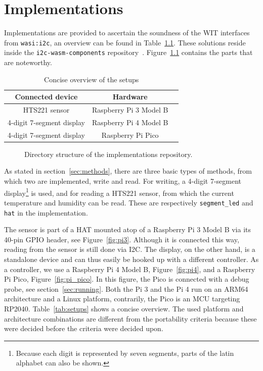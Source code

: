 \chapter{Implementations}
\label{chap:implementation}

Implementations are provided to ascertain the soundness of the \gls{WIT} interfaces from \texttt{wasi:i2c}, an overview can be found in Table~\ref{tab:impls}. These solutions reside inside the \texttt{i2c-wasm-components} repository~\cite{gh:iwc}. Figure~\ref{fig:dirtree} contains the parts that are noteworthy.

\begin{table}[h]
	\centering
	\captionsetup{justification=centering}
	\begin{tabular}{c c l}
		\toprule
		Connected device & Hardware \\ \midrule
        HTS221 sensor & Raspberry Pi 3 Model B \\
        4-digit 7-segment display & Raspberry Pi 4 Model B \\
        4-digit 7-segment display & Raspberry Pi Pico  \\
		\bottomrule
	\end{tabular}
    \caption{Concise overview of the setups}
	\label{tab:impls}
\end{table}

\begin{figure}[h]
\caption{Directory structure of the implementations repository.}
\label{fig:dirtree}
\end{figure}

As stated in section~\ref{sec:methods}, there are three basic types of methods, from which two are implemented, write and read. For writing, a 4-digit 7-segment display\footnote{Because each digit is represented by seven segments, parts of the latin alphabet can also be shown.} is used, and for reading a HTS221 sensor, from which the current temperature and humidity can be read. These are respectively \texttt{segment\_led} and \texttt{hat} in the implementation.

The sensor is part of a \gls{HAT} mounted atop of a Raspberry Pi 3 Model B via its 40-pin GPIO header, see Figure~\ref{fig:pi3}. Although it is connected this way, reading from the sensor is still done via \gls{I2C}. The display, on the other hand, is a standalone device and can thus easily be hooked up with a different controller. As a controller, we use a Raspberry Pi 4 Model B, Figure~\ref{fig:pi4}, and a Raspberry Pi Pico, Figure~\ref{fig:pi_pico}. In this figure, the Pico is connected with a debug probe, see section~\ref{sec:running}. Both the Pi 3 and the Pi 4 run on an ARM64 architecture and a Linux platform, contrarily, the Pico is an \gls{MCU} targeting RP2040. Table~\ref{tab:setups} shows a concise overview.
The used platform and architecture combinations are different from the portability criteria because these were decided before the criteria were decided upon.

